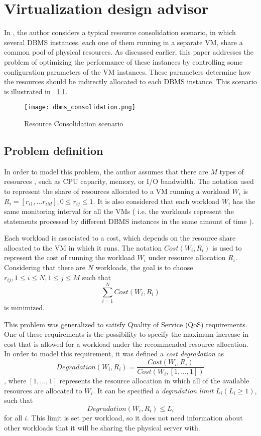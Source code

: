 \chapter{\textbf{Virtualization design advisor}}

\label{Virtualization design advisor}


In \cite{Soror:2008:AVM:1376616.1376711}, the author considers a typical resource consolidation scenario, in which several DBMS instances, each one of them running in a separate VM, share a common pool of physical resources. As discussed earlier, this paper addresses the problem of optimizing the performance of these instances by controlling some configuration parameters of the VM instances. These parameters determine how the resources should be indirectly allocated to each DBMS instance. This scenario is illustrated in ~\ref{fig:scenario}.


\begin{figure}[ht]
\centering
\texttt{[image: dbms\_consolidation.png]}
\caption{Resource Consolidation scenario}
\label{fig:scenario}
\end{figure} 

\section{Problem definition}

In order to model this problem, the author assumes that there are  $M$ types of resources , such as CPU capacity, memory, or I/O bandwidth. The notation used to represent the share of resources allocated to a VM running a workload $W_{i}$ is $R_{i} = [r_{i1},...r_{iM}], 0 \leq r_{ij} \leq 1$. It is also considered that each workload $W_{i}$ has the same monitoring interval for all the VMs ( i.e. the workloads represent the statements processed by different DBMS instances in the same amount of time ).

Each workload is associated to a cost, which depends on the resource share allocated to the VM in which it runs. The notation $Cost(W_{i},R_{i})$ is used to represent the cost of running the workload $W_{i}$ under resource allocation $R_{i}$. Considering that there are $N$ workloads, the goal is to choose $r_{ij}, 1 \leq i \leq N, 1 \leq j \leq M$ such that 
\[
  \sum_{i=1}^{N} Cost(W_{i},R_{i})
\]
is minimized.

This problem was generalized to satisfy Quality of Service (QoS) requirements. One of these requirements is the possibility to specify the maximum increase in cost that is allowed for a workload under the recommended resource allocation. In order to model this requirement, it was defined a \textit{cost degradation} as
\[
 Degradation(W_{i},R_{i}) = \frac{Cost(W_{i},R_{i})}{Cost(W_{i},[1,...,1])}
\]
, where $[1,...,1]$ represents the resource allocation in which all of the available resources are allocated to $W_{i}$. It can be specified a \textit{degradation limit} $L_{i} ( L_{i} \geq 1 )$, such that 
\[
 Degradation(W_{i}, R_{i}) \leq L_{i}
\]
for all $i$. This limit is set per workload, so it does not need information about other workloads that it will be sharing the physical server with.

